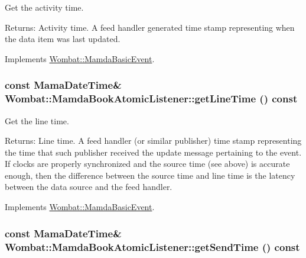 Get the activity time. 

\begin{Desc}
\item[Returns:]Activity time. A feed handler generated time stamp representing when the data item was last updated. \end{Desc}


Implements \hyperlink{classWombat_1_1MamdaBasicEvent_b3810afc69474ef3b192ee4c9307e714}{Wombat::Mamda\-Basic\-Event}.\hypertarget{classWombat_1_1MamdaBookAtomicListener_e390bbef9be51d4e4a63f3c7bab42926}{
\subsubsection[getLineTime]{\setlength{\rightskip}{0pt plus 5cm}const Mama\-Date\-Time\& Wombat::Mamda\-Book\-Atomic\-Listener::get\-Line\-Time () const}}
\label{classWombat_1_1MamdaBookAtomicListener_e390bbef9be51d4e4a63f3c7bab42926}


Get the line time. 

\begin{Desc}
\item[Returns:]Line time. A feed handler (or similar publisher) time stamp representing the time that such publisher received the update message pertaining to the event. If clocks are properly synchronized and the source time (see above) is accurate enough, then the difference between the source time and line time is the latency between the data source and the feed handler. \end{Desc}


Implements \hyperlink{classWombat_1_1MamdaBasicEvent_3fcc26fa1a6446bcec12b11ac74ed26d}{Wombat::Mamda\-Basic\-Event}.\hypertarget{classWombat_1_1MamdaBookAtomicListener_b3acc7062c4aefa9bc7da4a6f810f5d1}{
\subsubsection[getSendTime]{\setlength{\rightskip}{0pt plus 5cm}const Mama\-Date\-Time\& Wombat::Mamda\-Book\-Atomic\-Listener::get\-Send\-Time () const}}
\label{classWombat_1_1MamdaBookAtomicListener_b3acc7062c4aefa9bc7da4a6f810f5d1}


